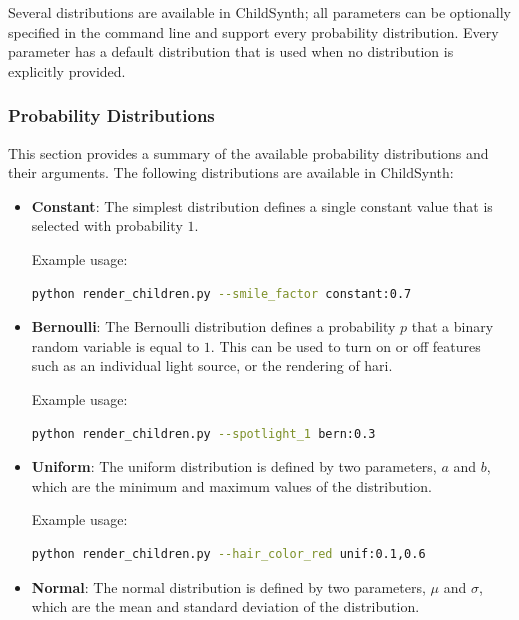 \documentclass{article}
\begin{document}
Several distributions are available in ChildSynth; all parameters can be optionally specified in the command line and support every probability distribution. Every parameter has a default distribution that is used when no distribution is explicitly provided.

\subsubsection{Probability Distributions}

This section provides a summary of the available probability distributions and their arguments. The following distributions are available in ChildSynth:

\begin{itemize}

    \item {\textbf{Constant}: The simplest distribution defines a single constant value that is selected with probability $1$.}
    
    Example usage:
    \begin{lstlisting}[language=bash]
python render_children.py --smile_factor constant:0.7 \end{lstlisting}
    
    \item \textbf{Bernoulli}: The Bernoulli distribution defines a probability $p$ that a binary random variable is equal to $1$. This can be used to turn on or off features such as an individual light source, or the rendering of hari. 
    
    Example usage:
    \begin{lstlisting}[language=bash]
python render_children.py --spotlight_1 bern:0.3\end{lstlisting}
   
    \item \textbf{Uniform}: The uniform distribution is defined by two parameters, $a$ and $b$, which are the minimum and maximum values of the distribution. 
    
    Example usage:
    \begin{lstlisting}[language=bash]
python render_children.py --hair_color_red unif:0.1,0.6\end{lstlisting}
    
    \item \textbf{Normal}: The normal distribution is defined by two parameters, $\mu$ and $\sigma$, which are the mean and standard deviation of the distribution.
    

\end{itemize}
\end{document}
